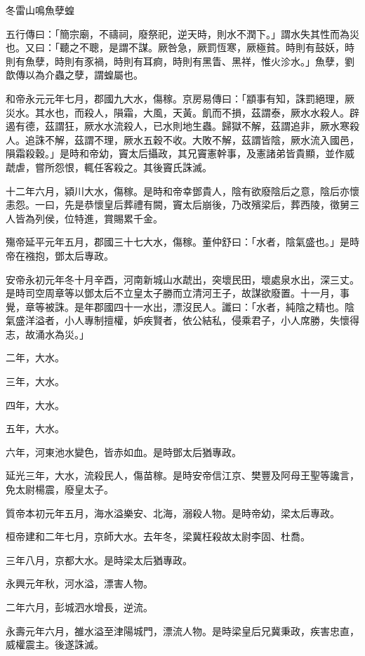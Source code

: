 
\begin{pinyinscope}
冬雷山鳴魚孽蝗

五行傳曰：「簡宗廟，不禱祠，廢祭祀，逆天時，則水不潤下。」謂水失其性而為災也。又曰：「聽之不聰，是謂不謀。厥咎急，厥罰恆寒，厥極貧。時則有鼓妖，時則有魚孽，時則有豕禍，時則有耳痾，時則有黑眚、黑祥，惟火沴水。」魚孽，劉歆傳以為介蟲之孽，謂蝗屬也。

和帝永元元年七月，郡國九大水，傷稼。京房易傳曰：「顓事有知，誅罰絕理，厥災水。其水也，而殺人，隕霜，大風，天黃。飢而不損，茲謂泰，厥水水殺人。辟遏有德，茲謂狂，厥水水流殺人，已水則地生蟲。歸獄不解，茲謂追非，厥水寒殺人。追誅不解，茲謂不理，厥水五穀不收。大敗不解，茲謂皆陰，厥水流入國邑，隕霜殺穀。」是時和帝幼，竇太后攝政，其兄竇憲幹事，及憲諸弟皆貴顯，並作威虣虐，嘗所怨恨，輒任客殺之。其後竇氏誅滅。

十二年六月，潁川大水，傷稼。是時和帝幸鄧貴人，陰有欲廢陰后之意，陰后亦懷恚怨。一曰，先是恭懷皇后葬禮有闕，竇太后崩後，乃改殯梁后，葬西陵，徵舅三人皆為列侯，位特進，賞賜累千金。

殤帝延平元年五月，郡國三十七大水，傷稼。董仲舒曰：「水者，陰氣盛也。」是時帝在襁抱，鄧太后專政。

安帝永初元年冬十月辛酉，河南新城山水虣出，突壞民田，壞處泉水出，深三丈。是時司空周章等以鄧太后不立皇太子勝而立清河王子，故謀欲廢置。十一月，事覺，章等被誅。是年郡國四十一水出，漂沒民人。讖曰：「水者，純陰之精也。陰氣盛洋溢者，小人專制擅權，妒疾賢者，依公結私，侵乘君子，小人席勝，失懷得志，故涌水為災。」

二年，大水。

三年，大水。

四年，大水。

五年，大水。

六年，河東池水變色，皆赤如血。是時鄧太后猶專政。

延光三年，大水，流殺民人，傷苗稼。是時安帝信江京、樊豐及阿母王聖等讒言，免太尉楊震，廢皇太子。

質帝本初元年五月，海水溢樂安、北海，溺殺人物。是時帝幼，梁太后專政。

桓帝建和二年七月，京師大水。去年冬，梁冀枉殺故太尉李固、杜喬。

三年八月，京都大水。是時梁太后猶專政。

永興元年秋，河水溢，漂害人物。

二年六月，彭城泗水增長，逆流。

永壽元年六月，雒水溢至津陽城門，漂流人物。是時梁皇后兄冀秉政，疾害忠直，威權震主。後遂誅滅。


\end{pinyinscope}
